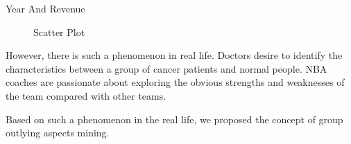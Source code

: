 \documentclass[
 size=12pt,
 paper=smartboard,  %
 mode=present, 		%
 display=slides, 	%
 style=tuliplab,  	%
 pauseslide,
 fleqn,leqno]{powerdot}
\begin{document}
\begin{slide}{Year And Revenue}
{\begin{figure}
    \caption{Scatter Plot}
  \end{figure}
  }
\begin{note}
However,
there is such a phenomenon in real life.
Doctors desire to identify the characteristics between
a group of cancer patients and normal people.
NBA coaches are passionate about exploring the obvious strengths and
weaknesses of the team compared with other teams.

Based on such a phenomenon in the real life,
we proposed the concept of group outlying aspects mining.
\end{note}
\end{slide}
\end{document}
